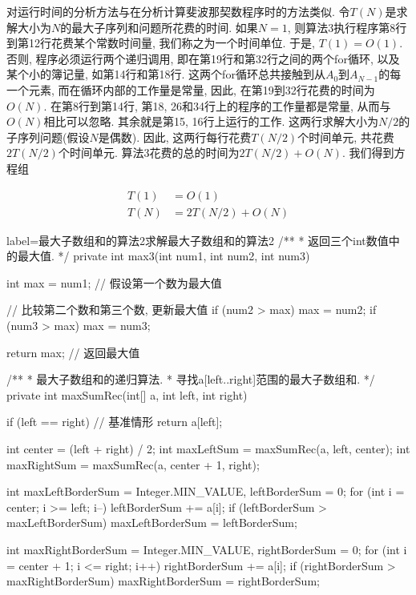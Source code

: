 \documentclass[oneside]{ctexbook}
\begin{document}
{对运行时间的分析方法与在分析计算斐波那契数程序时的方法类似. 令$T(N)$是求解大小为$N$的最大子序列和问题所花费的时间. 如果$N=1$, 则算法3执行程序第8行到第12行花费某个常数时间量, 我们称之为一个时间单位. 于是, $T(1)=O(1)$. 否则, 程序必须运行两个递归调用, 即在第19行和第32行之间的两个for循环, 以及某个小的簿记量, 如第14行和第18行. 这两个for循环总共接触到从$A_0$到$A_{N-1}$的每一个元素, 而在循环内部的工作量是常量, 因此, 在第19到32行花费的时间为$O(N)$. 在第8行到第14行, 第18, 26和34行上的程序的工作量都是常量, 从而与$O(N)$相比可以忽略. 其余就是第15, 16行上运行的工作. 这两行求解大小为$N/2$的子序列问题(假设$N$是偶数). 因此, 这两行每行花费$T(N/2)$个时间单元, 共花费$2T(N/2)$个时间单元. 算法3花费的总的时间为$2T(N/2)+O(N)$. 我们得到方程组

\begin{equation*}
    \begin{split}
        T(1) &= O(1) \\
        T(N) &= 2T(N/2)+O(N)
    \end{split}
\end{equation*}

\begin{myjava}{label={最大子数组和的算法2}}{求解最大子数组和的算法2}
/**
 * 返回三个int数值中的最大值.
 */
private int max3(int num1, int num2, int num3) {
    int max = num1; // 假设第一个数为最大值

    // 比较第二个数和第三个数, 更新最大值
    if (num2 > max) {
        max = num2;
    }
    if (num3 > max) {
        max = num3;
    }

    return max; // 返回最大值
}

/**
 * 最大子数组和的递归算法.
 * 寻找a[left..right]范围的最大子数组和.
 */
private int maxSumRec(int[] a, int left, int right) {
    if (left == right) // 基准情形
        return a[left];

    int center = (left + right) / 2;
    int maxLeftSum = maxSumRec(a, left, center);
    int maxRightSum = maxSumRec(a, center + 1, right);

    int maxLeftBorderSum = Integer.MIN_VALUE, leftBorderSum = 0;
    for (int i = center; i >= left; i--) {
        leftBorderSum += a[i];
        if (leftBorderSum > maxLeftBorderSum)
            maxLeftBorderSum = leftBorderSum;
    }

    int maxRightBorderSum = Integer.MIN_VALUE, rightBorderSum = 0;
    for (int i = center + 1; i <= right; i++) {
        rightBorderSum += a[i];
        if (rightBorderSum > maxRightBorderSum)
            maxRightBorderSum = rightBorderSum;
    }

}
\end{myjava}}
\end{document}
